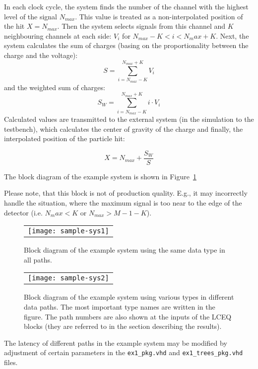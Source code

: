 \documentclass[preprint,11pt]{elsarticle}
\begin{document}
In each clock cycle, the system finds the number of the channel with the highest level of the signal $N_{max}$. This value is treated as a non-interpolated position of the hit $X=N_{max}$.
Then the system selects signals from this channel and $K$ neighbouring channels at each side: $V_i$ for $N_{max}-K < i < N_max+K$. Next, the system calculates the sum of charges (basing on the proportionality between the charge and the voltage):
	$$S=\sum_{i=N_{max}-K}^{N_{max}+K}{V_i}$$
 and the weighted sum of charges:
	$$S_{W}=\sum_{i=N_{max}-K}^{N_{max}+K}{i \cdot V_i}$$
Calculated values are transmitted to the external system (in the simulation to the
testbench), which calculates the center of gravity of the charge and finally, the interpolated position of the particle hit:
	
$$X=N_{max}+\frac{S_{W}}{S}$$
	
The block diagram of the example system is shown in Figure~\ref{fig:sample-sys1}
	
Please note, that this block is not of production quality. E.g., it may incorrectly
handle the situation, where the maximum signal is too near to the edge of the detector
	(i.e. $N_max<K$ or $N_{max}>M-1-K$).
\begin{figure}[t]
 {   
   \begin{center}
   \begin{tabular}{c}
	   \texttt{[image: sample-sys1]}
   \end{tabular}
   \end{center}
   \caption
	{ \label{fig:sample-sys1}
	Block diagram of the example system using the same data type in all paths.
	}
   }
\end{figure}
\begin{figure}[t]
 {   
   \begin{center}
   \begin{tabular}{c}
	   \texttt{[image: sample-sys2]}
   \end{tabular}
   \end{center}
   \caption
	{ \label{fig:sample-sys2}
	Block diagram of the example system using various types in different data paths.
	The most important type names are written in the figure.
	The path numbers are also shown at the inputs of the LCEQ blocks (they are referred to
	in the section describing the results).
	}
   }
\end{figure}

The latency of different paths in the example system may be modified by adjustment
of certain parameters in the \verb|ex1_pkg.vhd| and \verb|ex1_trees_pkg.vhd| files.
\end{document}
